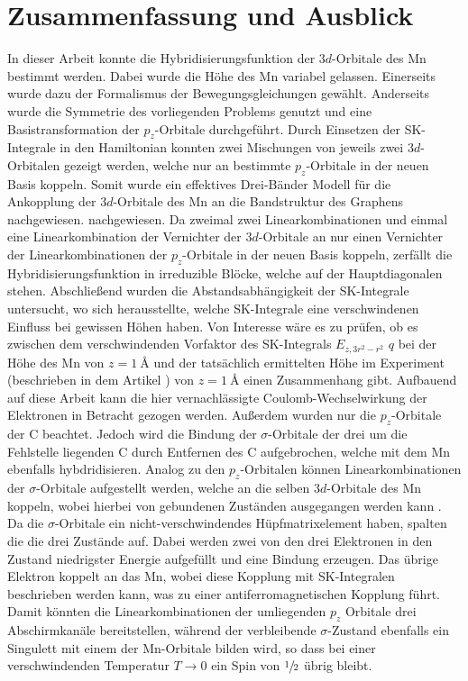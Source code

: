 \chapter{Zusammenfassung und Ausblick}
\label{chap:Zusammenfassung_und_Ausblick}
In dieser Arbeit konnte die Hybridisierungsfunktion der $3d$-Orbitale des Mn bestimmt werden.
Dabei wurde die Höhe des Mn variabel gelassen.
Einerseits wurde dazu der Formalismus der Bewegungsgleichungen gewählt.
Anderseits wurde die Symmetrie des vorliegenden Problems genutzt und eine Basistransformation der $p_z$-Orbitale durchgeführt. 
Durch Einsetzen der SK-Integrale in den Hamiltonian konnten zwei Mischungen von jeweils zwei $3d$-Orbitalen gezeigt werden, welche nur 
an bestimmte $p_z$-Orbitale in der neuen Basis koppeln.
Somit wurde ein effektives Drei-Bänder Modell für die Ankopplung der $3d$-Orbitale des Mn an die Bandstruktur des Graphens nachgewiesen.
nachgewiesen.
Da zweimal zwei Linearkombinationen und einmal eine Linearkombination der Vernichter der $3d$-Orbitale an nur einen Vernichter der Linearkombinationen
der $p_z$-Orbitale in der neuen Basis koppeln, zerfällt die Hybridisierungsfunktion in irreduzible Blöcke, welche auf der Hauptdiagonalen stehen. 
Abschließend wurden die Abstandsabhängigkeit der SK-Integrale untersucht, wo sich herausstellte, welche SK-Integrale 
eine verschwindenen Einfluss bei gewissen Höhen haben.
Von Interesse wäre es zu prüfen, ob es zwischen dem verschwindenden Vorfaktor des SK-Integrals $E_{z,3r^2-r^2}$ $q$ bei der Höhe 
des Mn von $z=\qty{1}{\angstrom}$ und der tatsächlich ermittelten Höhe im Experiment (beschrieben in dem 
Artikel \cite{doi:10.1021/acsnano.1c00139}) von $z=\qty{1}{\angstrom}$ einen Zusammenhang gibt.
Aufbauend auf diese Arbeit kann die hier vernachlässigte Coulomb-Wechselwirkung der Elektronen in Betracht gezogen werden.
Außerdem wurden nur die $p_z$-Orbitale der C beachtet.
Jedoch wird die Bindung der $\sigma$-Orbitale der drei um die Fehlstelle liegenden C durch Entfernen des C
aufgebrochen, welche mit dem Mn ebenfalls hybdridisieren.
Analog zu den $p_z$-Orbitalen können Linearkombinationen der $\sigma$-Orbitale aufgestellt werden, welche an die selben 
$3d$-Orbitale des Mn koppeln, wobei hierbei von gebundenen Zuständen ausgegangen werden kann \cite{PhysRevB.97.155419}.
Da die $\sigma$-Orbitale ein nicht-verschwindendes Hüpfmatrixelement haben, spalten die die drei Zustände auf.
Dabei werden zwei von den drei Elektronen in den Zustand niedrigster Energie aufgefüllt und eine Bindung erzeugen. 
Das übrige Elektron koppelt an das Mn, wobei diese Kopplung mit SK-Integralen beschrieben werden kann, was 
zu einer antiferromagnetischen Kopplung führt.
Damit könnten die Linearkombinationen der umliegenden $p_z$ Orbitale drei Abschirmkanäle bereitstellen, während der verbleibende $\sigma$-Zustand
ebenfalls ein Singulett mit einem der Mn-Orbitale bilden wird, so dass bei einer verschwindenden Temperatur $T \to 0$ ein Spin von 
$\sfrac{1}{2}$ übrig bleibt.